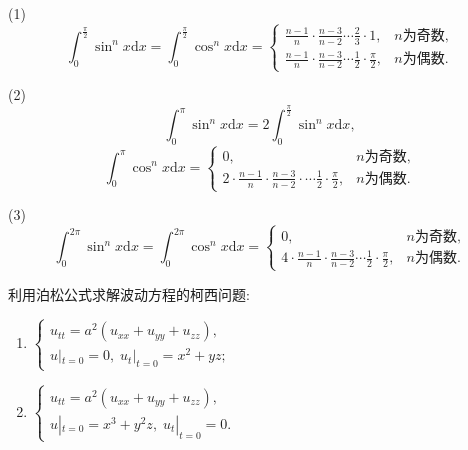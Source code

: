 \begin{note}[Wallis公式]
	(1)
	$$\int_0^{\frac{\pi}{2}}\sin^nx\mathrm dx=\int_0^{\frac{\pi}{2}}\cos^nx\mathrm dx=\begin{cases}\frac{n-1}{n}\cdot\frac{n-3}{n-2}\cdots\frac{2}{3}\cdot1,&n\text{为奇数,}\\\frac{n-1}{n}\cdot\frac{n-3}{n-2}\cdots\frac{1}{2}\cdot\frac{\pi}{2},&n\text{为偶数.}\end{cases}$$
	
	(2)
	$$\int_0^\pi\sin^nx\mathrm{d}x=2\int_0^{\frac{\pi}{2}}\sin^nx\mathrm{d}x,$$
	$$\int_0^\pi\cos^nx\mathrm{d}x=\begin{cases}0,&n\text{为奇数,}\\2\cdot\frac{n-1}{n}\cdot\frac{n-3}{n-2}\cdot\cdots\frac{1}{2}\cdot\frac{\pi}{2},&n\text{为偶数.}\end{cases}$$
	
	(3)
	$$\int_0^{2\pi}\sin^nx\mathrm{d}x=\int_0^{2\pi}\cos^nx\mathrm{d}x=\begin{cases}0,&n\text{为奇数,}\\4\cdot\frac{n-1}{n}\cdot\frac{n-3}{n-2}\cdots\frac{1}{2}\cdot\frac{\pi}{2},&n\text{为偶数.}\end{cases} $$
\end{note}

\begin{exercise}
  利用泊松公式求解波动方程的柯西问题:
  \begin{enumerate}[(1)]
    \item $\begin{cases}
            u_{tt} = a^2(u_{xx}+u_{yy}+u_{zz}), \\
            u|_{t=0}=0,\; u_t|_{t=0}=x^2+yz;
          \end{cases}$
    \item $\begin{cases}
            u_{tt} = a^2(u_{xx}+u_{yy}+u_{zz}), \\
            u|_{t=0}=x^3+y^2z,\; u_t|_{t=0}=0.
           \end{cases}$
  \end{enumerate}
\end{exercise}

